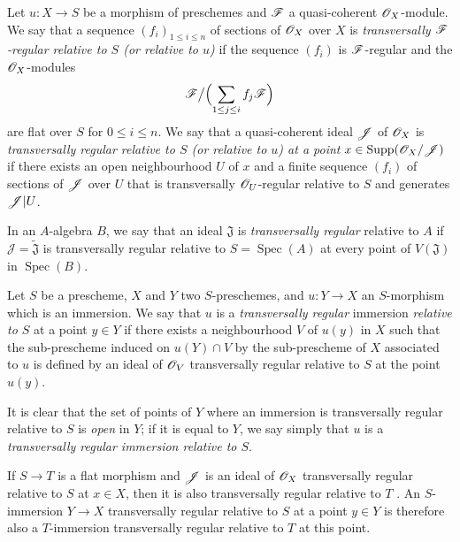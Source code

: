 
\begin{definition}[19.2.1]
\label{IV.19.2.1}
Let $u:X\to S$ be a morphism of preschemes and $\mathscr{F}$ a quasi-coherent $\mathscr{O}_X$-module.
We say that a sequence $(f_i)_{1\leq i\leq n}$ of sections of $\mathscr{O}_X$ over $X$ is \emph{transversally $\mathscr{F}$-regular relative to $S$ (\emph{or} relative to $u$)} if the sequence $(f_i)$ is $\mathscr{F}$-regular and the $\mathscr{O}_X$-modules
\[
  \mathscr{F}\big/\Bigl(\sum_{1\leq j\leq i}f_j\mathscr{F}\Bigr)
\]
are flat over $S$ for $0\leq i\leq n$.
We say that a quasi-coherent ideal $\mathscr{J}$ of $\mathscr{O}_X$ is \emph{transversally regular relative to $S$ (\emph{or} relative to $u$) at a point} $x\in\operatorname{Supp}(\mathscr{O}_X/\mathscr{J})$ if there exists an open neighbourhood $U$ of $x$ and a finite sequence $(f_i)$ of sections of $\mathscr{J}$ over $U$ that is transversally $\mathscr{O}_U$-regular relative to $S$ and generates $\mathscr{J}|U$.
\end{definition}

In an $A$-algebra $B$, we say that an ideal $\mathfrak{J}$ is \emph{transversally regular} relative to $A$ if $\mathscr J=\widetilde{\mathfrak{J}}$ is transversally regular relative to $S=\operatorname{Spec}(A)$ at every point of $V(\mathfrak{J})$ in $\operatorname{Spec}(B)$.

\begin{definition}[19.2.2]
\label{IV.19.2.2}
Let $S$ be a prescheme, $X$ and $Y$ two $S$-preschemes, and $u:Y\to X$ an $S$-morphism which is an immersion.
We say that $u$ is a \emph{transversally regular} immersion \emph{relative to $S$} at a point $y\in Y$ if there exists a neighbourhood $V$ of $u(y)$ in $X$ such that the sub-prescheme induced on $u(Y)\cap V$ by the sub-prescheme of $X$ associated to $u$ is defined by an ideal of $\mathscr{O}_V$ transversally regular relative to $S$ at the point $u(y)$.
\end{definition}

It is clear that the set of points of $Y$ where an immersion is transversally regular relative to $S$ is \emph{open} in $Y$; if it is equal to $Y$, we say simply that $u$ is a \emph{transversally regular immersion relative to $S$}.

If $S\to T$ is a flat morphism and $\mathscr{J}$ is an ideal of $\mathscr{O}_X$ transversally regular relative to $S$ at $x\in X$, then it is also transversally regular relative to $T$ .
An $S$-immersion $Y\to X$ transversally regular relative to $S$ at a point $y\in Y$ is therefore also a $T$-immersion transversally regular relative to $T$ at this point.

